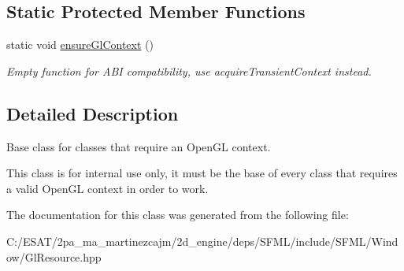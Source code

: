 \subsection*{Static Protected Member Functions}
\begin{DoxyCompactItemize}
\item 
\mbox{\label{classsf_1_1_gl_resource_ae0efa7935241644608ca32ba47b22a33}} 
static void \hyperlink{classsf_1_1_gl_resource_ae0efa7935241644608ca32ba47b22a33}{ensure\+Gl\+Context} ()
\begin{DoxyCompactList}\small\item\em Empty function for A\+BI compatibility, use acquire\+Transient\+Context instead. \end{DoxyCompactList}\end{DoxyCompactItemize}


\subsection{Detailed Description}
Base class for classes that require an Open\+GL context. 

This class is for internal use only, it must be the base of every class that requires a valid Open\+GL context in order to work. 

The documentation for this class was generated from the following file\+:\begin{DoxyCompactItemize}
\item 
C\+:/\+E\+S\+A\+T/2pa\+\_\+ma\+\_\+martinezcajm/2d\+\_\+engine/deps/\+S\+F\+M\+L/include/\+S\+F\+M\+L/\+Window/Gl\+Resource.\+hpp\end{DoxyCompactItemize}
